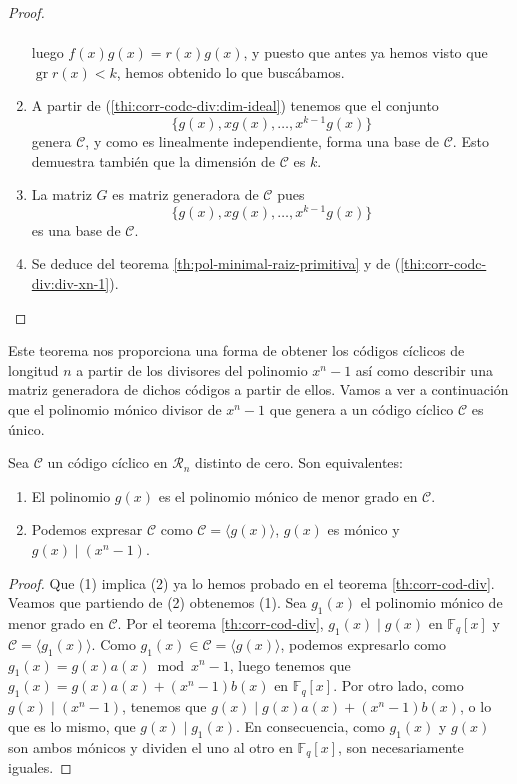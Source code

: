 \begin{proof}
\begin{enumerate}
\begin{align*}
    \end{align*}
    luego \(f(x)g(x) = r(x)g(x)\), y puesto que antes ya hemos visto que \(\operatorname{gr} r(x) < k\), hemos obtenido lo que buscábamos.
    \item A partir de (\ref{thi:corr-codc-div:dim-ideal}) tenemos que el conjunto \[\{g(x), xg(x), \dots, x^{k-1}g(x)\}\] genera \(\mathcal C\), y como es linealmente independiente, forma una base de \(\mathcal C\).
    Esto demuestra también que la dimensión de \(\mathcal C\) es \(k\).
    \item La matriz \(G\) es matriz generadora de \(\mathcal C\) pues \[\{g(x), xg(x), \dots, x^{k-1}g(x)\}\] es una base de \(\mathcal C\).
    \item Se deduce del teorema \ref{th:pol-minimal-raiz-primitiva} y de (\ref{thi:corr-codc-div:div-xn-1}).\qedhere
  \end{enumerate}
\end{proof}

Este teorema nos proporciona una forma de obtener los códigos cíclicos de longitud \(n\) a partir de los divisores del polinomio \(x^n - 1\) así como describir una matriz generadora de dichos códigos a partir de ellos.
Vamos a ver a continuación que el polinomio mónico divisor de \(x^n - 1\) que genera a un código cíclico \(\mathcal C\) es único.

\begin{corollary}
  \label{cor:pol-gen-unico}
  Sea \(\mathcal C\) un código cíclico en \(\mathcal R_n\) distinto de cero.
  Son equivalentes:
  \begin{enumerate}
    \item El polinomio \(g(x)\) es el polinomio mónico de menor grado en \(\mathcal C\).
    \item Podemos expresar \(\mathcal C\) como \(\mathcal C = \langle g(x)\rangle\), \(g(x)\) es mónico y \(g(x) \mid (x^n -1)\).
  \end{enumerate}
\end{corollary}

\begin{proof}
  Que (1) implica (2) ya lo hemos probado en el teorema \ref{th:corr-cod-div}. 
  Veamos que partiendo de (2) obtenemos (1). 
  Sea \(g_1(x)\) el polinomio mónico de menor grado en \(\mathcal C\).
  Por el teorema \ref{th:corr-cod-div}, \(g_1(x) \mid g(x)\) en \(\mathbb F_q[x]\) y \(\mathcal C = \langle g_1(x)\rangle\).
  Como \(g_1(x) \in \mathcal C = \langle g(x) \rangle\), podemos expresarlo como \(g_1(x) = g(x)a(x) \bmod x^n - 1\), luego tenemos que \(g_1(x) = g(x)a(x) + (x^n - 1)b(x)\) en \(\mathbb F_q[x]\).
  Por otro lado, como \(g(x) \mid (x^n - 1)\), tenemos que \(g(x) \mid g(x)a(x) + (x^n-1)b(x)\), o lo que es lo mismo, que \(g(x) \mid g_1(x)\). 
  En consecuencia, como \(g_1(x)\) y \(g(x)\) son ambos mónicos y dividen el uno al otro en \(\mathbb F_q[x]\), son necesariamente iguales.
\end{proof}

